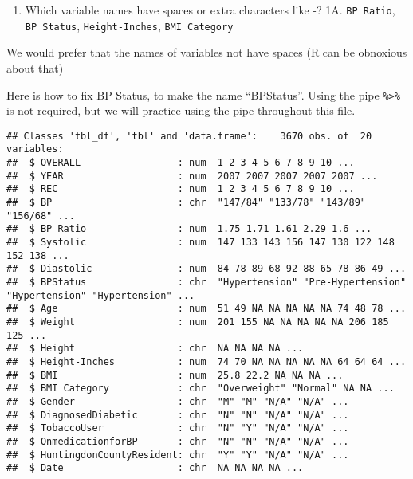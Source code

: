 \documentclass[
]{article}
\newenvironment{Shaded}{\begin{snugshade}}{\end{snugshade}}
\newcommand{\CommentTok}[1]{\textcolor[rgb]{0.56,0.35,0.01}{\textit{#1}}}
\newcommand{\DataTypeTok}[1]{\textcolor[rgb]{0.13,0.29,0.53}{#1}}
\newcommand{\KeywordTok}[1]{\textcolor[rgb]{0.13,0.29,0.53}{\textbf{#1}}}
\newcommand{\NormalTok}[1]{#1}
\newcommand{\OperatorTok}[1]{\textcolor[rgb]{0.81,0.36,0.00}{\textbf{#1}}}
\newcommand{\StringTok}[1]{\textcolor[rgb]{0.31,0.60,0.02}{#1}}
\providecommand{\tightlist}{%
  \setlength{\itemsep}{0pt}\setlength{\parskip}{0pt}}
\begin{document}
\begin{enumerate}
\def\labelenumi{\arabic{enumi}.}
\tightlist
\item
  Which variable names have spaces or extra characters like -? 1A.
  \texttt{BP\ Ratio}, \texttt{BP\ Status}, \texttt{Height-Inches},
  \texttt{BMI\ Category}
\end{enumerate}

We would prefer that the names of variables not have spaces (R can be
obnoxious about that)

Here is how to fix BP Status, to make the name ``BPStatus''. Using the
pipe \texttt{\%\textgreater{}\%} is not required, but we will practice
using the pipe throughout this file.

\begin{Shaded}
\end{Shaded}

\begin{verbatim}
## Classes 'tbl_df', 'tbl' and 'data.frame':    3670 obs. of  20 variables:
##  $ OVERALL                 : num  1 2 3 4 5 6 7 8 9 10 ...
##  $ YEAR                    : num  2007 2007 2007 2007 2007 ...
##  $ REC                     : num  1 2 3 4 5 6 7 8 9 10 ...
##  $ BP                      : chr  "147/84" "133/78" "143/89" "156/68" ...
##  $ BP Ratio                : num  1.75 1.71 1.61 2.29 1.6 ...
##  $ Systolic                : num  147 133 143 156 147 130 122 148 152 138 ...
##  $ Diastolic               : num  84 78 89 68 92 88 65 78 86 49 ...
##  $ BPStatus                : chr  "Hypertension" "Pre-Hypertension" "Hypertension" "Hypertension" ...
##  $ Age                     : num  51 49 NA NA NA NA NA 74 48 78 ...
##  $ Weight                  : num  201 155 NA NA NA NA NA 206 185 125 ...
##  $ Height                  : chr  NA NA NA NA ...
##  $ Height-Inches           : num  74 70 NA NA NA NA NA 64 64 64 ...
##  $ BMI                     : num  25.8 22.2 NA NA NA ...
##  $ BMI Category            : chr  "Overweight" "Normal" NA NA ...
##  $ Gender                  : chr  "M" "M" "N/A" "N/A" ...
##  $ DiagnosedDiabetic       : chr  "N" "N" "N/A" "N/A" ...
##  $ TobaccoUser             : chr  "N" "Y" "N/A" "N/A" ...
##  $ OnmedicationforBP       : chr  "N" "N" "N/A" "N/A" ...
##  $ HuntingdonCountyResident: chr  "Y" "Y" "N/A" "N/A" ...
##  $ Date                    : chr  NA NA NA NA ...
\end{verbatim}
\end{document}
